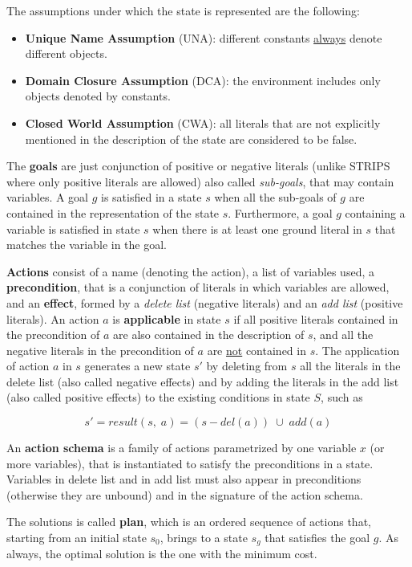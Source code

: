 \documentclass{article}
\begin{document}
The assumptions under which the state is represented are the following:
\begin{itemize}
    \item \textbf{Unique Name Assumption} (UNA): different constants \underline{always} denote different objects.
    \item \textbf{Domain Closure Assumption} (DCA): the environment includes only objects denoted by constants.
    \item \textbf{Closed World Assumption} (CWA): all literals that are not explicitly mentioned in the description of the state are considered to be false.
\end{itemize}

The \textbf{goals} are just conjunction of positive or negative literals (unlike STRIPS where only positive literals are allowed) also called \textit{sub-goals}, that may contain variables. A goal $g$ is satisfied in a state $s$ when all the sub-goals of $g$ are contained in the representation of the state $s$. Furthermore, a goal $g$ containing a variable is satisfied in state $s$ when there is at least one ground literal in $s$ that matches the variable in the goal.    

\textbf{Actions} consist of a name (denoting the action), a list of variables used, a \textbf{precondition}, that is a conjunction of literals in which variables are allowed, and an \textbf{effect}, formed by a \textit{delete list} (negative literals) and an \textit{add list} (positive literals). An action $a$ is \textbf{applicable} in state $s$ if all positive literals contained in the precondition of $a$ are also contained in the description of $s$, and all the negative literals in the precondition of $a$ are \underline{not} contained in $s$.
The application of action $a$ in $s$ generates a new state $s'$ by deleting from $s$ all the literals in the delete list (also called negative effects) and by adding the literals in the add list (also called positive effects) to the existing conditions in state $S$, such as
    
    $$s' = result(s,\;a) = (s - del(a)) \;\cup\; add(a)$$

An \textbf{action schema} is a family of actions parametrized by one variable $x$ (or more variables), that is instantiated to satisfy the preconditions in a state. Variables in delete list and in add list must also appear in preconditions (otherwise they are unbound) and in the signature of the action schema.

The solutions is called \textbf{plan}, which is an ordered sequence of actions that, starting from an initial state $s_0$, brings to a state $s_g$ that satisfies the goal $g$. As always, the optimal solution is the one with the minimum cost. 
\end{document}
